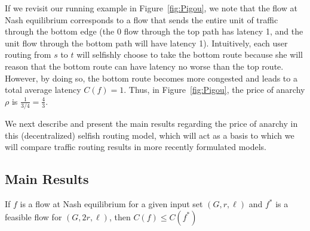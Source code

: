 If we revisit our running example in Figure~\ref{fig:Pigou}, we note that the flow at Nash equilibrium corresponds to a flow that sends the entire unit of traffic through the bottom edge (the 0 flow through the top path has latency 1, and the unit flow through the bottom path will have latency 1).
Intuitively, each user routing from $s$ to $t$ will selfishly choose to take the bottom route because she will reason that the bottom route can have latency no worse than the top route. However, by doing so, the bottom route becomes more congested and leads to a total average latency $C(f) = 1$.
Thus, in Figure~\ref{fig:Pigou}, the price of anarchy $\rho$ is $\frac{1}{3/4} = \frac{4}{3}$.

We next describe and present the main results regarding the price of anarchy in this (decentralized) selfish routing model, which will act as a basis to which we will compare traffic routing results in more recently formulated models.

\subsection{Main Results}
\begin{theorem}
    If $f$ is a flow at Nash equilibrium for a given input set $(G, r, \ell)$ and $f^*$ is a feasible flow for $(G, 2r, \ell)$, then $C(f) \leq C(f^*)$
\end{theorem}


